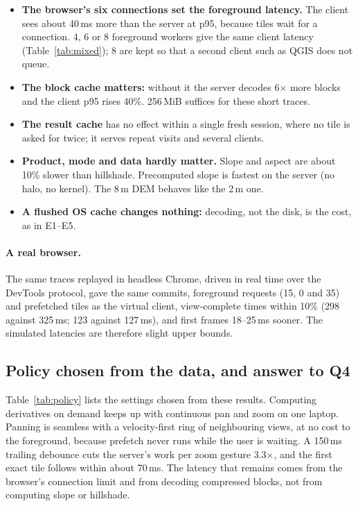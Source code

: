 \documentclass[11pt,a4paper]{article}
\begin{document}
\begin{itemize}
  \item \textbf{The browser's six connections set the foreground latency.} The client sees about 40\,ms more than the
  server at p95, because tiles wait for a connection. 4, 6 or 8 foreground workers give the same client latency
  (Table~\ref{tab:mixed}); 8 are kept so that a second client such as QGIS does not queue.
  \item \textbf{The block cache matters:} without it the server decodes 6$\times$ more blocks and the client p95 rises
  40\%. 256\,MiB suffices for these short traces.
  \item \textbf{The result cache} has no effect within a single fresh session, where no tile is asked for twice; it
  serves repeat visits and several clients.
  \item \textbf{Product, mode and data hardly matter.} Slope and aspect are about 10\% slower than hillshade.
  Precomputed slope is fastest on the server (no halo, no kernel). The 8\,m DEM behaves like the 2\,m one.
  \item \textbf{A flushed OS cache changes nothing:} decoding, not the disk, is the cost, as in E1--E5.
\end{itemize}

\paragraph{A real browser.} The same traces replayed in headless Chrome, driven in real time over the DevTools
protocol, gave the same commits, foreground requests (15, 0 and 35) and prefetched tiles as the virtual client,
view-complete times within 10\% (298 against 325\,ms; 123 against 127\,ms), and first frames 18--25\,ms sooner. The
simulated latencies are therefore slight upper bounds.

\subsection{Policy chosen from the data, and answer to Q4}
Table~\ref{tab:policy} lists the settings chosen from these results. Computing derivatives on demand keeps up with continuous pan and zoom on one laptop.
Panning is seamless with a velocity-first ring of neighbouring views, at no cost to the foreground, because prefetch
never runs while the user is waiting. A 150\,ms trailing debounce cuts the server's work per zoom gesture
3.3$\times$, and the first exact tile follows within about 70\,ms. The latency that remains comes from the browser's
connection limit and from decoding compressed blocks, not from computing slope or hillshade.
\end{document}
